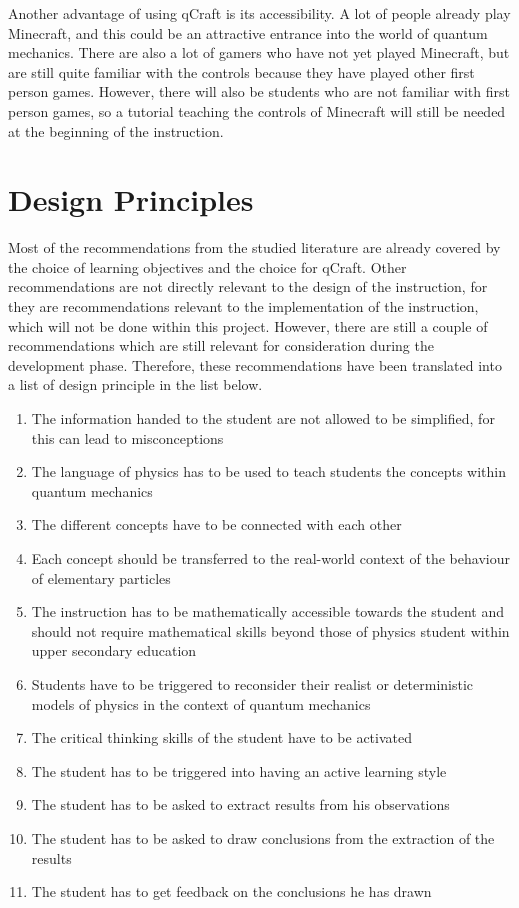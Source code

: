 \documentclass[11pt,twoside]{report} %
\begin{document}
Another advantage of using qCraft is its accessibility. A lot of people already play Minecraft, and this could be an attractive entrance into the world of quantum mechanics. There are also a lot of gamers who have not yet played Minecraft, but are still quite familiar with the controls because they have played other first person games. However, there will also be students who are not familiar with first person games, so a tutorial teaching the controls of Minecraft will still be needed at the beginning of the instruction.

\chapter{Design Principles}
\label{ch:designprinciples}

Most of the recommendations from the studied literature are already covered by the choice of learning objectives and the choice for qCraft. Other recommendations are not directly relevant to the design of the instruction, for they are recommendations relevant to the implementation of the instruction, which will not be done within this project. However, there are still a couple of recommendations which are still relevant for consideration during the development phase. Therefore, these recommendations have been translated into a list of design principle in the list below.

\begin{enumerate}
\item \label{itm:simple}The information handed to the student are not allowed to be simplified, for this can lead to misconceptions
\item \label{itm:language} The language of physics has to be used to teach students the concepts within quantum mechanics
\item \label{itm:links}The different concepts have to be connected with each other
\item \label{itm:realworld}Each concept should be transferred to the real-world context of the behaviour of elementary particles
\item \label{itm:maths}The instruction has to be mathematically accessible towards the student and should not require mathematical skills beyond those of physics student within upper secondary education
\item \label{itm:models}Students have to be triggered to reconsider their realist or deterministic models of physics in the context of quantum mechanics
\item \label{itm:critic}The critical thinking skills of the student have to be activated
\item \label{itm:active}The student has to be triggered into having an active learning style
\item \label{itm:results}The student has to be asked to extract results from his observations
\item \label{itm:conclusions}The student has to be asked to draw conclusions from the extraction of the results
\item \label{itm:feedback}The student has to get feedback on the conclusions he has drawn
\end{enumerate}
\end{document}
